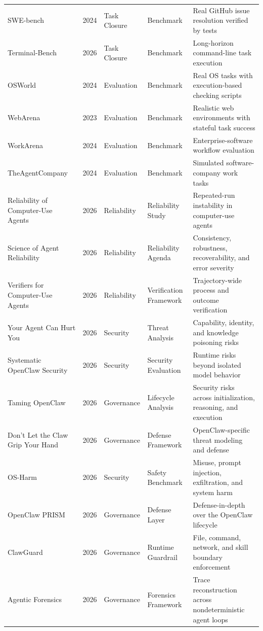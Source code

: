 \begin{table}[t]
{\begin{tabular}{@{} l l l l l @{}}
SWE-bench~\cite{jimenez2023swebench} & 2024 & Task Closure & Benchmark & Real GitHub issue resolution verified by tests \\
Terminal-Bench~\cite{merrill2026terminalbench} & 2026 & Task Closure & Benchmark & Long-horizon command-line task execution \\
OSWorld~\cite{xie2024osworld} & 2024 & Evaluation & Benchmark & Real OS tasks with execution-based checking scripts \\
WebArena~\cite{zhou2023webarena} & 2023 & Evaluation & Benchmark & Realistic web environments with stateful task success \\
WorkArena~\cite{drouin2024workarena} & 2024 & Evaluation & Benchmark & Enterprise-software workflow evaluation \\
TheAgentCompany~\cite{theagentcompany2024} & 2024 & Evaluation & Benchmark & Simulated software-company work tasks \\
Reliability of Computer-Use Agents~\cite{reliability2026computeruse} & 2026 & Reliability & Reliability Study & Repeated-run instability in computer-use agents \\
Science of Agent Reliability~\cite{rabanser2026sciencereliability} & 2026 & Reliability & Reliability Agenda & Consistency, robustness, recoverability, and error severity \\
Verifiers for Computer-Use Agents~\cite{rosset2026verifiers} & 2026 & Reliability & Verification Framework & Trajectory-wide process and outcome verification \\
Your Agent Can Hurt You~\cite{wang2026youragent} & 2026 & Security & Threat Analysis & Capability, identity, and knowledge poisoning risks \\
Systematic OpenClaw Security~\cite{wang2026openclawsec} & 2026 & Security & Security Evaluation & Runtime risks beyond isolated model behavior \\
Taming OpenClaw~\cite{deng2026tamingopenclaw} & 2026 & Governance & Lifecycle Analysis & Security risks across initialization, reasoning, and execution \\
Don't Let the Claw Grip Your Hand~\cite{shan2026dontlettheclaw} & 2026 & Governance & Defense Framework & OpenClaw-specific threat modeling and defense \\
OS-Harm~\cite{kuntz2026osharm} & 2026 & Security & Safety Benchmark & Misuse, prompt injection, exfiltration, and system harm \\
OpenClaw PRISM~\cite{li2026prism} & 2026 & Governance & Defense Layer & Defense-in-depth over the OpenClaw lifecycle \\
ClawGuard~\cite{zhao2026clawguard} & 2026 & Governance & Runtime Guardrail & File, command, network, and skill boundary enforcement \\
Agentic Forensics~\cite{gruber2026agenticforensics} & 2026 & Governance & Forensics Framework & Trace reconstruction across nondeterministic agent loops \\

\bottomrule
\end{tabular}
}
\end{table}